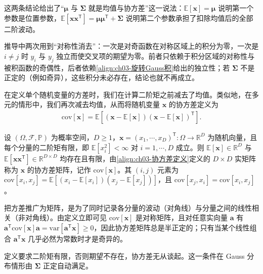 \documentclass[../../main.tex]{subfiles}
\begin{document}
\begin{remark}
这两条结论给出了“$\boldsymbol{\mu}$ 与 $\boldsymbol{\Sigma}$ 就是均值与协方差”这一说法：$\mathbb{E}[\boldsymbol{x}]=\boldsymbol{\mu}$ 说明第一个参数是位置参数，$\mathbb{E}[\boldsymbol{x}\boldsymbol{x}^{\mathsf{T}}]=\boldsymbol{\mu}\boldsymbol{\mu}^{\mathsf{T}}+\boldsymbol{\Sigma}$ 说明第二个参数承担了扣除均值后的全部二阶波动。

推导中两次用到“对称性消去”：一次是对奇函数在对称区域上的积分为零，一次是 $i\neq j$ 时 $y_i$ 与 $y_j$ 独立而使交叉项的期望为零。前者只依赖于积分区域的对称性与被积函数的奇偶性，后者依赖\eqref{align:ch03-旋转Gauss积}给出的独立性；若 $\boldsymbol{\Sigma}$ 不是正定的（例如奇异），这些积分未必存在，结论也就不再成立。
\end{remark}

在定义单个随机变量的方差时，我们在计算二阶矩之前减去了均值。类似地，在多元的情形中，我们再次减去均值，从而将随机变量 $\boldsymbol{x}$ 的协方差定义为
\begin{align}
\mathrm{cov}[\boldsymbol{x}]=\mathbb{E}\left[(\boldsymbol{x}-\mathbb{E}[\boldsymbol{x}])(\boldsymbol{x}-\mathbb{E}[\boldsymbol{x}])^{\mathsf{T}}\right].
\label{align:ch03-协方差定义}
\end{align}

\begin{definition}[随机向量的协方差矩阵]\label{definition:ch03-协方差矩阵}
设 $(\Omega,\mathcal{F},\mathbb{P})$ 为概率空间，$D\geqslant1$，$\boldsymbol{x}=(x_1,\cdots,x_D)^{\mathsf{T}}:\Omega\to\mathbb{R}^{D}$ 为随机向量，且每个分量的二阶矩有限，即 $\mathbb{E}[x_i^{2}]<\infty$ 对 $i=1,\cdots,D$ 成立。则 $\mathbb{E}[\boldsymbol{x}]\in\mathbb{R}^{D}$ 与 $\mathbb{E}[\boldsymbol{x}\boldsymbol{x}^{\mathsf{T}}]\in\mathbb{R}^{D\times D}$ 均存在且有限，由\eqref{align:ch03-协方差定义}定义的 $D\times D$ 实矩阵称为 $\boldsymbol{x}$ 的协方差矩阵，记作 $\mathrm{cov}[\boldsymbol{x}]$。其 $(i,j)$ 元素为 $\mathrm{cov}[x_i,x_j]=\mathbb{E}[(x_i-\mathbb{E}[x_i])(x_j-\mathbb{E}[x_j])]$，且 $\mathrm{cov}[x_j,x_i]=\mathrm{cov}[x_i,x_j]$。
\end{definition}

\begin{remark}
把方差推广为矩阵，是为了同时记录各分量的波动（对角线）与分量之间的线性相关（非对角线）。由定义立即可见 $\mathrm{cov}[\boldsymbol{x}]$ 是对称矩阵，且对任意实向量 $\boldsymbol{a}$ 有 $\boldsymbol{a}^{\mathsf{T}}\mathrm{cov}[\boldsymbol{x}]\boldsymbol{a}=\mathrm{var}[\boldsymbol{a}^{\mathsf{T}}\boldsymbol{x}]\geqslant0$，因此协方差矩阵总是半正定的；只有当某个线性组合 $\boldsymbol{a}^{\mathsf{T}}\boldsymbol{x}$ 几乎必然为常数时才是奇异的。

定义要求二阶矩有限，否则期望不存在，协方差无从谈起。这一条件在 Gauss 分布情形由 $\boldsymbol{\Sigma}$ 正定自动满足。
\end{remark}
\end{document}
